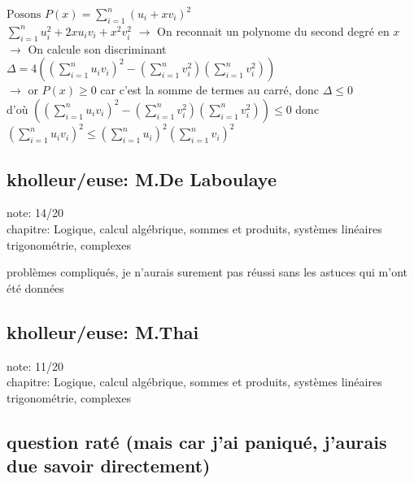 \documentclass{article}
\begin{document}
\( \text{Posons } P(x) = \sum_{i=1}^n (u_i+xv_i)^2 \) \\
\( \sum_{i=1}^n u_i^2 + 2xu_i v_i +x^2 v_i^2 \) \hspace{5mm} \( \rightarrow \) \hspace{5mm} On reconnait un polynome du second degré en $x$ \\
$\rightarrow$ \hspace{2mm} On calcule son discriminant $\Delta = 4 \left( \left(\sum_{i=1}^n u_i v_i \right)^2 - \left(\sum_{i=1}^n v_i^2 \right) \left(\sum_{i=1}^n v_i^2 \right) \right)$ \hspace{5mm} \\
$\rightarrow$ \hspace{2mm} or $P(x) \geqslant 0$ car c'est la somme de termes au carré, donc $\Delta \leqslant 0$ \\
d'où \hspace{2mm} $\left( \left(\sum_{i=1}^n u_i v_i \right)^2 - \left(\sum_{i=1}^n v_i^2 \right) \left(\sum_{i=1}^n v_i^2 \right) \right) \leqslant 0$ \hspace{2mm} donc \hspace{2mm} $\left(\sum_{i=1}^{n} u_i v_i \right)^2 \leqslant \left(\sum_{i=1}^{n} u_i\right)^2 \left(\sum_{i=1}^{n} v_i \right)^2$


\subsection{kholleur/euse: M.De Laboulaye}

note: 14/20 \\
chapitre: Logique, calcul algébrique, sommes et produits, systèmes linéaires trigonométrie, complexes\\

\vspace{5mm}

problèmes compliqués, je n'aurais surement pas réussi sans les astuces qui m'ont été données

\subsection{kholleur/euse: M.Thai}

note: 11/20 \\
chapitre: Logique, calcul algébrique, sommes et produits, systèmes linéaires trigonométrie, complexes\\

\subsection{question raté (mais car j'ai paniqué, j'aurais due savoir directement)}
\end{document}
